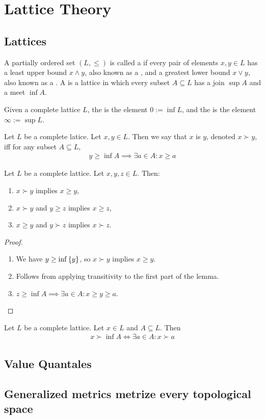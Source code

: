 \chapter{Lattice Theory}
\section{Lattices}
\begin{definition}
	A partially ordered set $(L,\leq)$ is called a  if every pair of elements $x,y \in L$ has a least upper bound $x \wedge y$, also known as a , and a greatest lower bound $x \vee y$, also known as a . A  is a lattice in which every subset $A \subseteq L$ has a join $\sup A$ and a meet $\inf A$.
\end{definition}
\begin{definition}
	Given a complete lattice $L$, the  is the element $0 := \inf L$, and the  is the element $\infty := \sup L$.
\end{definition}
\begin{definition}
	Let $L$ be a complete latice. Let $x,y \in L$. Then we say that $x$ is  $y$, denoted $x \succ y$, iff for any subset $A \subseteq L$,
	\begin{align*}
		y \geq \inf A \implies \exists a \in A : x \geq a
	\end{align*}
\end{definition}
\begin{lemma}
	Let $L$ be a complete lattice. Let $x,y,z \in L$. Then:
	\begin{enumerate}
		\item $x \succ y$ implies $x \geq y$,
		\item $x \succ y$ and $y \geq z$ implies $x \geq z$,
		\item $x \geq y$ and $y \succ z$ implies $x \succ z$.
	\end{enumerate}
\end{lemma}
\begin{proof}
	\begin{enumerate}
		\item We have $y \geq \inf \lr{y}$, so $x \succ y$ implies $x \geq y$.
		\item Follows from applying transitivity to the first part of the lemma.
		\item $z \geq \inf A \implies \exists a \in A : x \geq y \geq a$.
	\end{enumerate}
\end{proof}
\begin{lemma}
	Let $L$ be a complete lattice. Let $x \in L$ and $A \subseteq L$. Then
	\begin{align*}
		x \succ \inf A \Leftrightarrow \exists a \in A : x \succ a
	\end{align*}
\end{lemma}
\section{Value Quantales}
\section{Generalized metrics metrize every topological space}